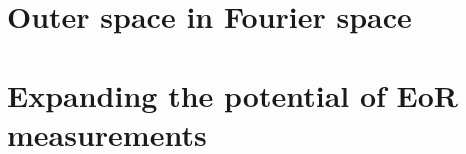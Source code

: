 \documentclass[12pt,twoside,openany]{book}
\begin{document}
\part{Outer space in Fourier space}

%
%
%

%
%

%
%

% 
%

%
%

%
%

%
%
\part{Expanding the potential of EoR measurements}




%
%


\begin{appendices}


\end{appendices}

\newpage
%


\end{document}
